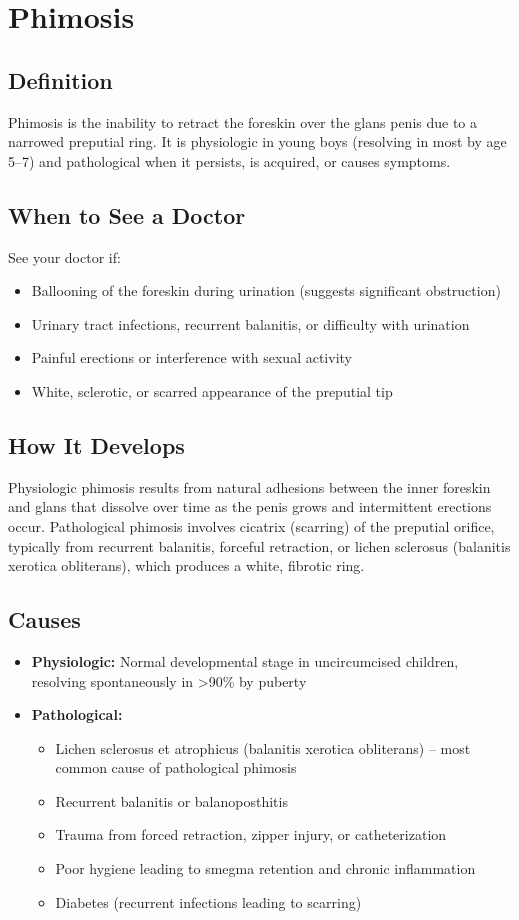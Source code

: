 \chapter{Phimosis}

\section*{Definition}
Phimosis is the inability to retract the foreskin over the glans penis due to a narrowed preputial ring. It is physiologic in young boys (resolving in most by age 5--7) and pathological when it persists, is acquired, or causes symptoms.

\section*{When to See a Doctor}
See your doctor if:
\begin{itemize}
  \item Ballooning of the foreskin during urination (suggests significant obstruction)
  \item Urinary tract infections, recurrent balanitis, or difficulty with urination
  \item Painful erections or interference with sexual activity
  \item White, sclerotic, or scarred appearance of the preputial tip
\end{itemize}

\section*{How It Develops}
Physiologic phimosis results from natural adhesions between the inner foreskin and glans that dissolve over time as the penis grows and intermittent erections occur. Pathological phimosis involves cicatrix (scarring) of the preputial orifice, typically from recurrent balanitis, forceful retraction, or lichen sclerosus (balanitis xerotica obliterans), which produces a white, fibrotic ring.

\section*{Causes}
\begin{itemize}
  \item \textbf{Physiologic:} Normal developmental stage in uncircumcised children, resolving spontaneously in >90\% by puberty
  \item \textbf{Pathological:}
  \begin{itemize}
    \item Lichen sclerosus et atrophicus (balanitis xerotica obliterans) -- most common cause of pathological phimosis
    \item Recurrent balanitis or balanoposthitis
    \item Trauma from forced retraction, zipper injury, or catheterization
    \item Poor hygiene leading to smegma retention and chronic inflammation
    \item Diabetes (recurrent infections leading to scarring)
  \end{itemize}
\end{itemize}

